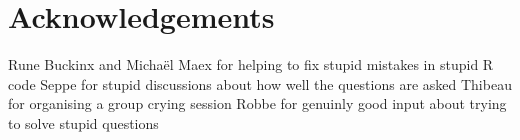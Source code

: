 \documentclass[a4paper]{article}
\begin{document}
\section*{Acknowledgements}
Rune Buckinx and Michaël Maex for helping to fix stupid mistakes in stupid R code
Seppe for stupid discussions about how well the questions are asked
Thibeau for organising a group crying session
Robbe for genuinly good input about trying to solve stupid questions


\end{document}
